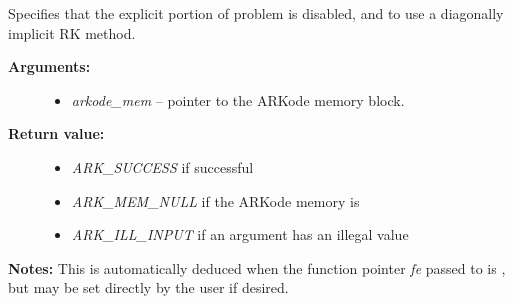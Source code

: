 \documentclass[letterpaper,10pt,english]{sphinxmanual}
\begin{document}
\begin{fulllineitems}
\label{c_interface/User_callable:ARKodeSetImplicit}
Specifies that the explicit portion of problem is disabled,
and to use a diagonally implicit RK method.
\begin{description}
\item[{\textbf{Arguments:}}] \leavevmode\begin{itemize}
\item {} 
\emph{arkode\_mem} -- pointer to the ARKode memory block.

\end{itemize}

\item[{\textbf{Return value:}}] \leavevmode\begin{itemize}
\item {} 
\emph{ARK\_SUCCESS} if successful

\item {} 
\emph{ARK\_MEM\_NULL} if the ARKode memory is 

\item {} 
\emph{ARK\_ILL\_INPUT} if an argument has an illegal value

\end{itemize}

\end{description}

\textbf{Notes:} This is automatically deduced when the function pointer \emph{fe}
passed to {\hyperref[c_interface/User_callable:ARKodeInit]{}} is , but may be set directly by the
user if desired.

\end{fulllineitems}

\end{document}
